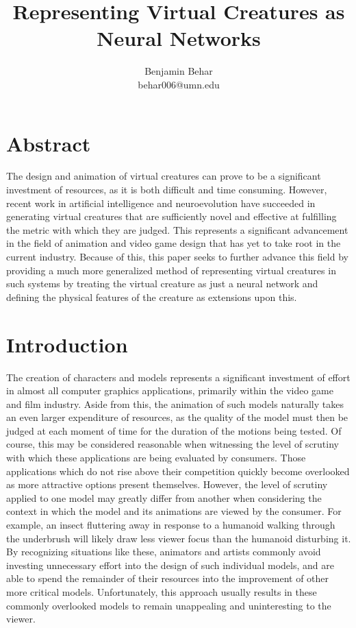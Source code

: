 \documentclass[12pt]{article}
\title{Representing Virtual Creatures as Neural Networks}
\author{Benjamin Behar\\behar006@umn.edu}
\begin{document}
\maketitle
\section*{Abstract}
The design and animation of virtual creatures can prove to be a significant investment of resources, as it is both difficult and time consuming.
However, recent work in artificial intelligence and neuroevolution have succeeded in generating virtual creatures that are sufficiently novel and effective at fulfilling the metric with which they are judged.
This represents a significant advancement in the field of animation and video game design that has yet to take root in the current industry.
Because of this, this paper seeks to further advance this field by providing a much more generalized method of representing virtual creatures in such systems by treating the virtual creature as just a neural network and defining the physical features of the creature as extensions upon this.

\section*{Introduction}

The creation of characters and models represents a significant investment of effort in almost all computer graphics applications, primarily within the video game and film industry.
Aside from this, the animation of such models naturally takes an even larger expenditure of resources, as the quality of the model must then be judged at each moment of time for the duration of the motions being tested.
Of course, this may be considered reasonable when witnessing the level of scrutiny with which these applications are being evaluated by consumers.
Those applications which do not rise above their competition quickly become overlooked as more attractive options present themselves.
However, the level of scrutiny applied to one model may greatly differ from another when considering the context in which the model and its animations are viewed by the consumer.
For example, an insect fluttering away in response to a humanoid walking through the underbrush will likely draw less viewer focus than the humanoid disturbing it.
By recognizing situations like these, animators and artists commonly avoid investing unnecessary effort into the design of such individual models, and are able to spend the remainder of their resources into the improvement of other more critical models.
Unfortunately, this approach usually results in these commonly overlooked models to remain unappealing and uninteresting to the viewer.
\end{document}
